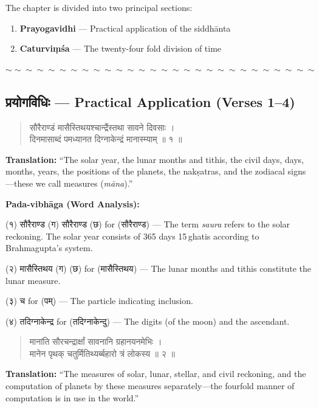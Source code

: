 \documentclass[11pt,a4paper]{article}
\newcommand{\dev}[1]{{\devanagarifont #1}}
\newenvironment{shloka}
  {\begin{verse}\devanagarifont\color{versecolor}}
  {\end{verse}}
\newenvironment{commentary}
  {\small\color{commentarycolor}\par\noindent\ignorespaces}
  {\par}
\newcommand{\wavydivider}{\begin{center}$\sim\sim\sim\sim\sim\sim\sim\sim\sim\sim\sim\sim\sim\sim\sim\sim\sim\sim\sim\sim\sim\sim\sim\sim\sim\sim\sim\sim$\end{center}}
\begin{document}
The chapter is divided into two principal sections:
\begin{enumerate}[label=(\roman*),leftmargin=2em]
  \item \textbf{Prayogavidhi} --- Practical application of the siddhānta
  \item \textbf{Caturviṃśa} --- The twenty-four fold division of time
\end{enumerate}

\wavydivider

\subsection*{\dev{प्रयोगविधिः} --- Practical Application (Verses 1--4)}

\begin{shloka}
\dev{सौरैराण्डं मासैस्तिथयश्चान्द्रैंस्तथा सावने दिवसाः ।}\\
\dev{दिनमासाब्दं पमध्यानत दिग्नाकेन्द्रं मानास्म्याम् ॥ १ ॥}
\end{shloka}

\textbf{Translation:} ``The solar year, the lunar months and tithis, the civil days, days, months, years, the positions of the planets, the nakṣatras, and the zodiacal signs---these we call measures (\textit{māna}).''

\begin{commentary}
\textbf{Pada-vibhāga (Word Analysis):}

\dev{(१) सौरैराण्ड (ग) सौरैराण्ड (छ) for (सौरैराण्ड)} --- The term \textit{saura} refers to the solar reckoning. The solar year consists of 365 days 15\textonehalf\,ghatis according to Brahmagupta's system.

\dev{(२) मासैस्तिथय (ग) (छ) for (मासैस्तिथय)} --- The lunar months and tithis constitute the lunar measure.

\dev{(३) च for (पम्)} --- The particle indicating inclusion.

\dev{(४) तदिग्नाकेन्द्र for (तदिग्नाकेन्दु)} --- The digits (of the moon) and the ascendant.
\end{commentary}

\begin{shloka}
\dev{मानांति सौरचन्द्रार्क्षां सावनानि ग्रहानयनमेभिः ।}\\
\dev{मानेन पृथक् चतुर्मितिथ्यर्ब्बहारो त्रं लोकस्य ॥ २ ॥}
\end{shloka}

\textbf{Translation:} ``The measures of solar, lunar, stellar, and civil reckoning, and the computation of planets by these measures separately---the fourfold manner of computation is in use in the world.''
\end{document}
